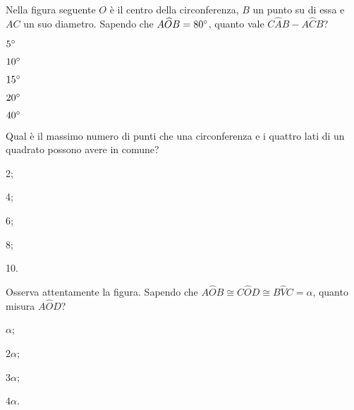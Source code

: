 \noindent\begin{minipage}{0.7\textwidth}\parindent15pt
\begin{esercizio}
\label{ese:5.62}
Nella figura seguente $O$ è il centro della circonferenza, $B$ un punto su di essa e $AC$ un suo diametro. Sapendo che $A\widehat{O}B=80{}^{\circ}$, quanto vale $C\widehat{A}B-A\widehat{C}B$?
\begin{enumeratea}
\item $5{}^{\circ}$
\item $10{}^{\circ}$
\item $15{}^{\circ}$
\item $20{}^{\circ}$
\item $40{}^{\circ}$
\end{enumeratea}
\end{esercizio}
\end{minipage}\hfil
\begin{minipage}{0.3\textwidth}
	\centering
\end{minipage}\vspace{5pt}

\begin{esercizio}
\label{ese:5.63}
Qual è il massimo numero di punti che una circonferenza e i quattro lati di un quadrato possono avere in comune?
\begin{multicols}{5}
\begin{enumeratea}
\item 2;
\item 4;
\item 6;
\item 8;
\item 10.
\end{enumeratea}
\end{multicols}
\end{esercizio}

\noindent\begin{minipage}{0.65\textwidth}\parindent15pt
\begin{esercizio}
\label{ese:5.64}
Osserva attentamente la figura. Sapendo che $A\widehat{O}B\cong C\widehat{O}D\cong B\widehat{V}C=\alpha$, quanto misura $A\widehat{O}D$?
\begin{multicols}{4}
\begin{enumeratea}
\item $\alpha$;
\item $2\alpha$;
\item $3\alpha$;
\item $4\alpha$.
\end{enumeratea}
\end{multicols}
\end{esercizio}
\end{minipage}\hfil
\begin{minipage}{0.35\textwidth}
	\centering
\end{minipage}\vspace{5pt}

